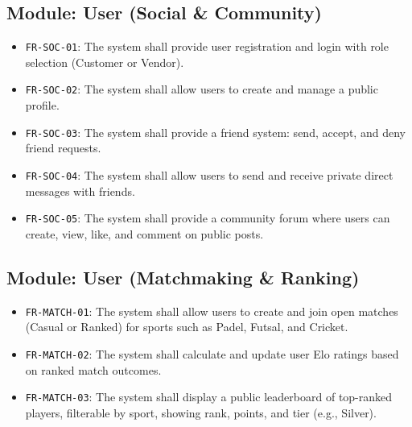 \subsection{Module: User (Social \& Community)}
\begin{itemize}
  \item \texttt{FR-SOC-01}: The system shall provide user registration and login with role selection (Customer or Vendor).
  \item \texttt{FR-SOC-02}: The system shall allow users to create and manage a public profile.
  \item \texttt{FR-SOC-03}: The system shall provide a friend system: send, accept, and deny friend requests.
  \item \texttt{FR-SOC-04}: The system shall allow users to send and receive private direct messages with friends.
  \item \texttt{FR-SOC-05}: The system shall provide a community forum where users can create, view, like, and comment on public posts.
\end{itemize}

\subsection{Module: User (Matchmaking \& Ranking)}
\begin{itemize}
  \item \texttt{FR-MATCH-01}: The system shall allow users to create and join open matches (Casual or Ranked) for sports such as Padel, Futsal, and Cricket.
  \item \texttt{FR-MATCH-02}: The system shall calculate and update user Elo ratings based on ranked match outcomes.
  \item \texttt{FR-MATCH-03}: The system shall display a public leaderboard of top-ranked players, filterable by sport, showing rank, points, and tier (e.g., Silver).
\end{itemize}

